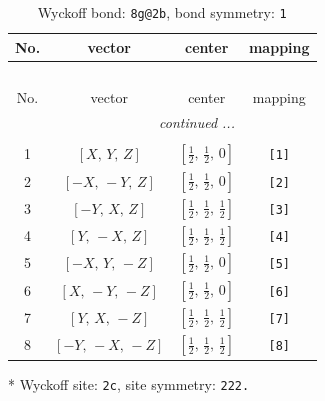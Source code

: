 \documentclass[fleqn,8pt]{jsarticle}
\begin{document}
\begin{longtable}{cccc}
\caption{Wyckoff bond: {\tt 8g@2b}, bond symmetry: {\tt 1}}
 \\
 \hline \hline
No. & vector & center & mapping \\ \hline \endfirsthead

\multicolumn{3}{l}{\tablename\ \thetable{}} \\
 \hline \hline
No. & vector & center & mapping \\ \hline \endhead

 \hline \hline
\multicolumn{3}{r}{\footnotesize\it continued ...} \\ \endfoot

 \hline \hline
\multicolumn{3}{r}{} \\ \endlastfoot

1 & $\left[ X,\, Y,\, Z \right]$ & $\left[ \frac{1}{2},\, \frac{1}{2},\, 0 \right]$ & {\tt [1]} \\ \hline
2 & $\left[ - X,\, - Y,\, Z \right]$ & $\left[ \frac{1}{2},\, \frac{1}{2},\, 0 \right]$ & {\tt [2]} \\ \hline
3 & $\left[ - Y,\, X,\, Z \right]$ & $\left[ \frac{1}{2},\, \frac{1}{2},\, \frac{1}{2} \right]$ & {\tt [3]} \\ \hline
4 & $\left[ Y,\, - X,\, Z \right]$ & $\left[ \frac{1}{2},\, \frac{1}{2},\, \frac{1}{2} \right]$ & {\tt [4]} \\ \hline
5 & $\left[ - X,\, Y,\, - Z \right]$ & $\left[ \frac{1}{2},\, \frac{1}{2},\, 0 \right]$ & {\tt [5]} \\ \hline
6 & $\left[ X,\, - Y,\, - Z \right]$ & $\left[ \frac{1}{2},\, \frac{1}{2},\, 0 \right]$ & {\tt [6]} \\ \hline
7 & $\left[ Y,\, X,\, - Z \right]$ & $\left[ \frac{1}{2},\, \frac{1}{2},\, \frac{1}{2} \right]$ & {\tt [7]} \\ \hline
8 & $\left[ - Y,\, - X,\, - Z \right]$ & $\left[ \frac{1}{2},\, \frac{1}{2},\, \frac{1}{2} \right]$ & {\tt [8]} \\
\end{longtable}
* Wyckoff site: {\tt 2c}, site symmetry: {\tt 222.}
\renewcommand{\arraystretch}{1.2}
\end{document}

